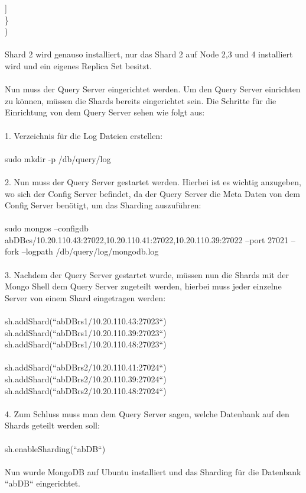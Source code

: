     ] \\
  \} \\
) \\
\\
Shard 2 wird genauso installiert, nur das Shard 2 auf Node 2,3 und 4 installiert wird und ein eigenes Replica Set besitzt.
\\
\\
Nun muss der Query Server eingerichtet werden. Um den Query Server einrichten zu k\"onnen, m\"ussen die Shards bereits eingerichtet sein. Die Schritte f\"ur die Einrichtung von dem Query Server sehen wie folgt aus:
\\
\\
1.	Verzeichnis f\"ur die Log Dateien erstellen:
\\
\\
sudo mkdir -p /db/query/log
\\
\\
2.	Nun muss der Query Server gestartet werden. Hierbei ist es wichtig anzugeben, wo sich der Config Server befindet, da der Query Server die Meta Daten von dem Config Server ben\"otigt, um das Sharding auszuf\"uhren:
\\
\\
sudo mongos --configdb abDBcs/10.20.110.43:27022,10.20.110.41:27022,10.20.110.39:27022 --port 27021 --fork --logpath /db/query/log/mongodb.log
\\
\\
3.	Nachdem der Query Server gestartet wurde, m\"ussen nun die Shards mit der Mongo Shell dem Query Server zugeteilt werden, hierbei muss jeder einzelne Server von einem Shard eingetragen werden:
\\
\\
sh.addShard(“abDBrs1/10.20.110.43:27023“) \\
sh.addShard(“abDBrs1/10.20.110.39:27023“) \\
sh.addShard(“abDBrs1/10.20.110.48:27023“) \\
\\
sh.addShard(“abDBrs2/10.20.110.41:27024“) \\
sh.addShard(“abDBrs2/10.20.110.39:27024“) \\
sh.addShard(“abDBrs2/10.20.110.48:27024“) \\
\\
4.	Zum Schluss muss man dem Query Server sagen, welche Datenbank auf den Shards geteilt werden soll:
\\
\\
sh.enableSharding(“abDB“)
\\
\\
Nun wurde MongoDB auf Ubuntu installiert und das Sharding f\"ur die Datenbank ``abDB`` eingerichtet.\cite{mongo01}
